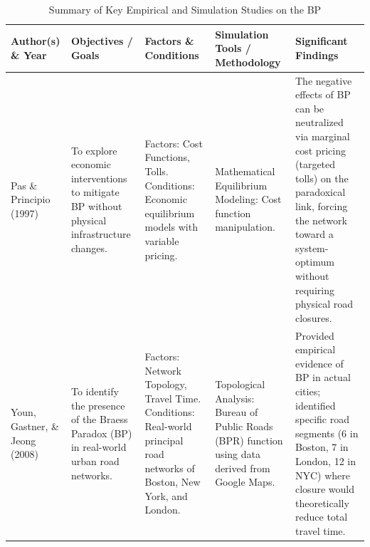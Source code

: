 \begin{landscape}

\begin{table}[p]
    \hspace*{2cm}
    \begin{minipage}{\dimexpr\linewidth-2cm\relax}
 
        \vspace{0.25cm}
        \begin{tabularx}{\linewidth}{|p{2.5cm}|X|X|X|X|}
        \hline
        \textbf{Author(s) \& Year} & \textbf{Objectives / Goals} & \textbf{Factors \& Conditions} & \textbf{Simulation Tools / Methodology} & \textbf{Significant Findings} \\
        \hline
        Pas \& Principio (1997) & To explore economic interventions to mitigate BP without physical infrastructure changes. & Factors: Cost Functions, Tolls. \newline \newline Conditions: Economic equilibrium models with variable pricing. & Mathematical Equilibrium Modeling: Cost function manipulation. & The negative effects of BP can be neutralized via marginal cost pricing (targeted tolls) on the paradoxical link, forcing the network toward a system-optimum without requiring physical road closures. \\
        \hline
        Youn, Gastner, \& Jeong (2008) & To identify the presence of the Braess Paradox (BP) in real-world urban road networks. & Factors: Network Topology, Travel Time. \newline \newline Conditions: Real-world principal road networks of Boston, New York, and London. & Topological Analysis: Bureau of Public Roads (BPR) function using data derived from Google Maps. & Provided empirical evidence of BP in actual cities; identified specific road segments (6 in Boston, 7 in London, 12 in NYC) where closure would theoretically reduce total travel time. \\
        \hline
        \end{tabularx}
        \caption{Summary of Key Empirical and Simulation Studies on the BP} 
    \end{minipage}
    
\end{table}

\begin{table}[p]
    \ContinuedFloat
    \hspace*{2cm}%
    \begin{minipage}{\dimexpr\linewidth-2cm\relax}


\end{minipage}
\end{table}
\end{landscape}
